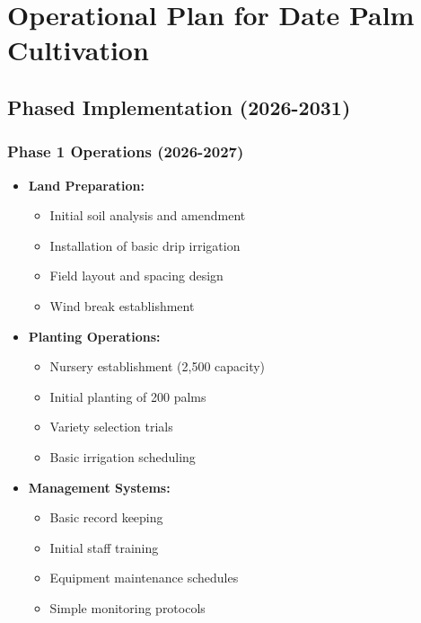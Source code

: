 \section{Operational Plan for Date Palm Cultivation}

\subsection{Phased Implementation (2026-2031)}

\subsubsection{Phase 1 Operations (2026-2027)}
\begin{itemize}
    \item \textbf{Land Preparation:}
    \begin{itemize}
        \item Initial soil analysis and amendment
        \item Installation of basic drip irrigation
        \item Field layout and spacing design
        \item Wind break establishment
    \end{itemize}
    \item \textbf{Planting Operations:}
    \begin{itemize}
        \item Nursery establishment (2,500 capacity)
        \item Initial planting of 200 palms
        \item Variety selection trials
        \item Basic irrigation scheduling
    \end{itemize}
    \item \textbf{Management Systems:}
    \begin{itemize}
        \item Basic record keeping
        \item Initial staff training
        \item Equipment maintenance schedules
        \item Simple monitoring protocols
    \end{itemize}
\end{itemize}

